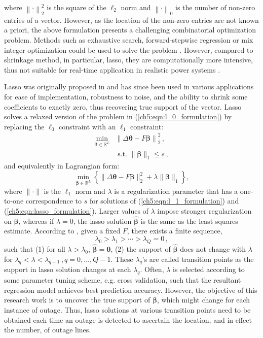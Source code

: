 where $\left\|\cdot\right\|^2_2$ is the square of the $\ell_2$ norm and $\left\|\cdot\right\|_0$ is the number of non-zero entries of a vector. However, as the location of the non-zero entries are not known a priori, the above formulation presents a challenging combinatorial optimization problem. Methods such as exhaustive search, forward-stepwise regression or mix integer optimization could be used to solve the problem \cite{bertsimas2020sparse}. However, compared to shrinkage method, in particular, lasso, they are computationally more intensive, thus not suitable for real-time application in realistic power systems \cite{hastie2020best}. 

Lasso was originally proposed in \cite{tibshirani1996regression} and has since been used in various applications for ease of implementation, robustness to noise, and the ability to shrink some coefficients to exactly zero, thus recovering true support of the vector. Lasso solves a relaxed version of the problem in (\ref{ch5:eqn:l_0_formulation}) by replacing the $\ell_0$ constraint with an $\ell_1$ constraint:
\begin{align}
\label{ch5:eqn:l_1_formulation}
\underset{\boldsymbol{\beta}  \in \mathbb{R}^{L} }{\min} &\left\|\Delta\boldsymbol{\theta} - F\boldsymbol{\beta}\right\|_{2}^{2} \,, \\
& \text { s.t. }\|\boldsymbol{\beta}\|_{1} \le s \nonumber\,,
\end{align}
and equivalently in Lagrangian form:
\begin{equation}
\label{ch5:eqn:lasso_formulation}
\min_{\boldsymbol{\beta} \in \mathbb{R}^{L}}\left\{\|\Delta\boldsymbol{\theta} - F\boldsymbol{\beta}\|_{2}^{2}+\lambda\|\boldsymbol{\beta}\|_{1}\right\},
\end{equation}
where $\|\cdot\|$ is the $\ell_1$ norm and $\lambda$ is a regularization parameter that has a one-to-one correspondence to $s$ for solutions of (\ref{ch5:eqn:l_1_formulation}) and (\ref{ch5:eqn:lasso_formulation}). Larger values of $\lambda$ impose stronger regularization on $\boldsymbol{\beta}$, whereas if $\lambda = 0$, the lasso solution $\boldsymbol{\hat{\beta}}$ is the same as the least squares estimate. According to \cite{zou2007degrees}, given a fixed $F$, there exists a finite sequence,
\begin{equation}
\label{ch5:eqn:transition_points}
\lambda_0 > \lambda_1 > \cdots > \lambda_Q = 0 \,,
\end{equation}
such that (1) for all $\lambda > \lambda_0$, $\boldsymbol{\hat{\beta}} = \mathbf{0}$, (2) the support of $\boldsymbol{\hat{\beta}}$ does not change with $\lambda$ for $\lambda_q < \lambda < \lambda_{q+1}\,, q=0, \dots, Q-1$. These $\lambda_q$'s are called transition points as the support in lasso solution changes at each $\lambda_q$. Often, $\lambda$ is selected according to some parameter tuning scheme, e.g. cross validation, such that the resultant regression model achieves best prediction accuracy. However, the objective of this research work is to uncover the true support of $\boldsymbol{\beta}$, which might change for each instance of outage. Thus, lasso solutions at various transition points need to be obtained each time an outage is detected to ascertain the location, and in effect the number, of outage lines. 

